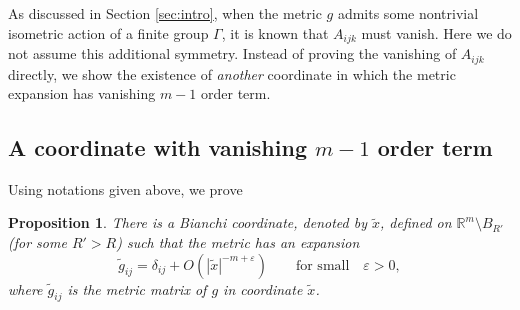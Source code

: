 \documentclass{amsart}
\newtheorem{prop}[thm]{Proposition}
\newcommand{\abs}[1]{\left\vert#1\right\vert}
\newcommand{\Real}{\mathbb R}
\numberwithin{equation}{section}
\begin{document}
As discussed in Section \ref{sec:intro}, when the metric $g$ admits some nontrivial isometric action of a finite group $\Gamma$, it is known that $A_{ijk}$ must vanish. Here we do not assume this additional symmetry. Instead of proving the vanishing of $A_{ijk}$ directly, we show the existence of {\it another} coordinate in which the metric expansion has vanishing $m-1$ order term.


\subsection{A coordinate with vanishing $m-1$ order term}

Using notations given above, we prove
\begin{prop}
	\label{prop:step1} There is a Bianchi coordinate, denoted by $\tilde{x}$, defined on $\Real^m \setminus B_{R'}$ (for some $R'>R$) such that the metric has an expansion
	\[
		\tilde{g}_{ij}=\delta_{ij} +O (\abs{\tilde{x}}^{-m+\varepsilon})\qquad \text{for small} \quad \varepsilon>0,
	\]
	where $\tilde{g}_{ij}$ is the metric matrix of $g$ in coordinate $\tilde{x}$.
\end{prop}
\end{document}
